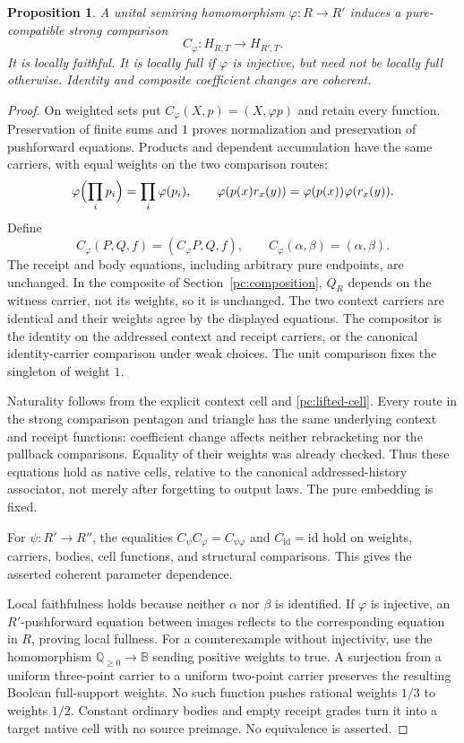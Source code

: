 \documentclass[11pt,a4paper]{article}
\newtheorem{proposition}[theorem]{Proposition}
\theoremstyle{definition}
\newcommand{\id}{\mathrm{id}}
\begin{document}
\begin{proposition}\label{pc:coefficient-comparison}
A unital semiring homomorphism $\varphi:R\to R'$ induces a pure-compatible
strong comparison
\[
 C_\varphi:H_{R,T}\longrightarrow H_{R',T}.
\]
It is locally faithful. It is locally full if $\varphi$ is injective, but
need not be locally full otherwise. Identity and composite coefficient
changes are coherent.
\end{proposition}
\begin{proof}
On weighted sets put
$C_\varphi(X,p)=(X,\varphi p)$ and retain every function. Preservation of
finite sums and $1$ proves normalization and preservation of pushforward
equations. Products and dependent accumulation have the same carriers,
with equal weights on the two comparison routes:
\[
 \varphi\Bigl(\prod_i p_i\Bigr)=\prod_i\varphi(p_i),\qquad
 \varphi(p(x)r_x(y))=\varphi(p(x))\varphi(r_x(y)).
\]
Define
\[
 C_\varphi(P,Q,f)=(C_\varphi P,Q,f),\qquad
 C_\varphi(\alpha,\beta)=(\alpha,\beta).
\]
The receipt and body equations, including arbitrary pure endpoints, are
unchanged. In the composite of Section~\ref{pc:composition}, $Q_R$ depends
on the witness carrier, not its weights, so it is unchanged. The two context
carriers are identical and their weights agree by the displayed equations.
The compositor is the identity on the addressed context and receipt
carriers, or the canonical identity-carrier comparison under weak choices.
The unit comparison fixes the singleton of weight $1$.

Naturality follows from the explicit context cell and
\eqref{pc:lifted-cell}. Every route in the strong comparison pentagon and
triangle has the same underlying context and receipt functions: coefficient
change affects neither rebracketing nor the pullback comparisons. Equality
of their weights was already checked. Thus these equations hold as native
cells, relative to the canonical addressed-history associator, not merely
after forgetting to output laws. The pure embedding is fixed.

For $\psi:R'\to R''$, the equalities
$C_\psi C_\varphi=C_{\psi\varphi}$ and $C_{\id}=\id$ hold on weights,
carriers, bodies, cell functions, and structural comparisons. This gives
the asserted coherent parameter dependence.

Local faithfulness holds because neither $\alpha$ nor $\beta$ is identified.
If $\varphi$ is injective, an $R'$-pushforward equation between images
reflects to the corresponding equation in $R$, proving local fullness.
For a counterexample without injectivity, use the homomorphism
$\mathbb Q_{\geq0}\to\mathbb B$ sending positive weights to true. A
surjection from a uniform three-point carrier to a uniform two-point carrier
preserves the resulting Boolean full-support weights. No such function
pushes rational weights $1/3$ to weights $1/2$. Constant ordinary bodies
and empty receipt grades turn it into a target native cell with no source
preimage. No equivalence is asserted.
\end{proof}
\end{document}

